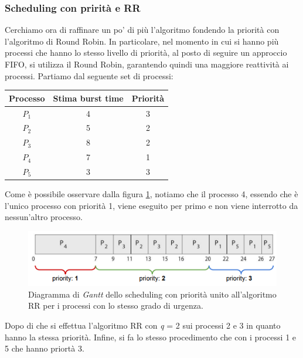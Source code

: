 \subsubsection{Scheduling con prirità e RR}
Cerchiamo ora di raffinare un po' di più l'algoritmo fondendo la priorità con l'algoritmo di Round Robin. In particolare, nel momento in cui si hanno più processi che hanno lo stesso livello di priorità, al posto di seguire un approccio FIFO, si utilizza il Round Robin, garantendo quindi una maggiore reattività ai processi. Partiamo dal seguente set di processi:
\begin{table}[h]
    \centering
    \begin{tabular}{c c c}
        \textbf{Processo} & \textbf{Stima burst time} & \textbf{Priorità} \\\hline
        $P_1$ & 4 & 3 \\
        $P_2$ & 5 & 2 \\
        $P_3$ & 8 & 2 \\
        $P_4$ & 7 & 1 \\
        $P_5$ & 3 & 3 \\\hline
    \end{tabular}
\end{table}

\noindent Come è possibile osservare dalla figura \ref{fig:priority_RR}, notiamo che il processo 4, essendo che è l'unico processo con priorità 1, viene eseguito per primo e non viene interrotto da nessun'altro processo.
\begin{figure}[h]
    \centering
    \includegraphics[width = .75\textwidth]{../res/imgs/CPU scheduling/priority_RR.png}
    \caption{Diagramma di \textit{Gantt} dello scheduling con priorità unito all'algoritmo RR per i processi con lo stesso grado di urgenza.}
    \label{fig:priority_RR}
\end{figure}
Dopo di che si effettua l'algoritmo RR con \textit{q} = 2 sui processi 2 e 3 in quanto hanno la stessa priorità. Infine, si fa lo stesso procedimento che con i processi 1 e 5 che hanno priortà 3. 

% 
